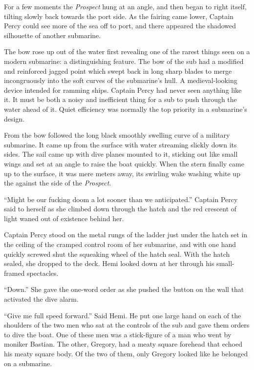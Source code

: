 \documentclass[]{scrbook}
\begin{document}
For a few moments the \emph{Prospect} hung at an angle, and then began
to right itself, tilting slowly back towards the port side. As the
fairing came lower, Captain Percy could see more of the sea off to port,
and there appeared the shadowed silhouette of another submarine.

The bow rose up out of the water first revealing one of the rarest
things seen on a modern submarine: a distinguishing feature. The bow of
the sub had a modified and reinforced jagged point which swept back in
long sharp blades to merge incongruously into the soft curves of the
submarine's hull. A medieval-looking device intended for ramming ships.
Captain Percy had never seen anything like it. It must be both a noisy
and inefficient thing for a sub to push through the water ahead of it.
Quiet efficiency was normally the top priority in a submarine's design.

From the bow followed the long black smoothly swelling curve of a
military submarine. It came up from the surface with water streaming
slickly down its sides. The sail came up with dive planes mounted to it,
sticking out like small wings and set at an angle to raise the boat
quickly. When the stern finally came up to the surface, it was mere
meters away, its swirling wake washing white up the against the side of
the \emph{Prospect}.

``Might be our fucking doom a lot sooner than we anticipated.'' Captain
Percy said to herself as she climbed down through the hatch and the red
crescent of light waned out of existence behind her.

Captain Percy stood on the metal rungs of the ladder just under the
hatch set in the ceiling of the cramped control room of her submarine,
and with one hand quickly screwed shut the squeaking wheel of the hatch
seal. With the hatch sealed, she dropped to the deck. Hemi looked down
at her through his small-framed spectacles.

``Down.'' She gave the one-word order as she pushed the button on the
wall that activated the dive alarm.

``Give me full speed forward.'' Said Hemi. He put one large hand on each
of the shoulders of the two men who sat at the controls of the sub and
gave them orders to dive the boat. One of these men was a stick-figure
of a man who went by moniker Bastian. The other, Gregory, had a meaty
square forehead that echoed his meaty square body. Of the two of them,
only Gregory looked like he belonged on a submarine.
\end{document}
